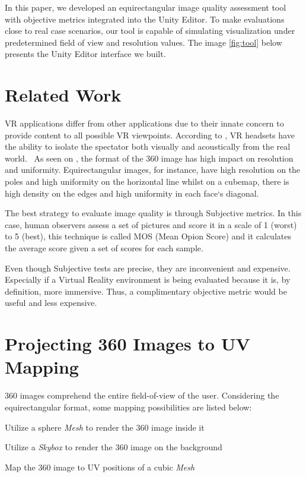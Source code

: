 \documentclass[12pt]{article}
\begin{document}
In this paper, we developed an equirectangular image quality assessment tool with objective metrics integrated into the Unity Editor. To make evaluations close to real case scenarios, our tool is capable of simulating visualization under predetermined field of view and resolution values. The image \ref{fig:tool} below presents the Unity Editor interface we built. 

\section{Related Work}
VR applications differ from other applications due to their innate concern to provide content to all possible VR viewpoints. According to \cite{fuchs2017virtual}, VR headsets have the ability to isolate the spectator both visually and acoustically from the real world.
~As seen on \cite{dunn2017resolution}, the format of the 360 image has high impact on resolution and uniformity. Equirectangular images, for instance, have high resolution on the poles and high uniformity on the horizontal line whilst on a cubemap, there is high density on the edges and high uniformity in each face`s diagonal.

The best strategy to evaluate image quality is through Subjective metrics. In this case, human observers assess a set of pictures and score it in a scale of 1 (worst) to 5 (best), this technique is called MOS (Mean Opion Score) and it calculates the average score given a set of scores for each sample.

Even though Subjective tests are precise, they are inconvenient and expensive. Especially if a Virtual Reality environment is being evaluated because it is, by definition, more immersive. Thus, a complimentary objective metric would be useful and less expensive.

\section{Projecting 360 Images to UV Mapping}
360 images comprehend the entire field-of-view of the user. Considering the equirectangular format, some mapping possibilities are listed below:

\begin{enumerate}
  \begin{item}Utilize a sphere \textit{Mesh} to render the 360 image inside it\end{item}
  \begin{item} Utilize a \textit{Skybox} to render the 360 image on the background\end{item}
  \begin{item} Map the 360 image to UV positions of a cubic \textit{Mesh} \end{item}
\end{enumerate}
\end{document}
